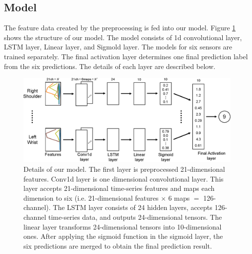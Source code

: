 \documentclass[graybox]{svmult}
\begin{document}
\subsection{Model}
\label{subsec:model}
The feature data created by the preprocessing is fed into our model. Figure \ref{fig:model} shows the structure of our model. The model consists of 1d convolutional layer, LSTM layer, Linear layer, and Sigmold layer. The models for six sensors are trained separately. The final activation layer determines one final prediction label from the six predictions. The details of each layer are described below.

\begin{figure}[h]
    \centering
    \includegraphics[width=1\linewidth]{figures/model.eps}
    \caption{Details of our model. The first layer is preprocessed 21-dimensional features. Conv1d layer is one dimensional convolutional layer. This layer accepts 21-dimensional time-series features and maps each dimension to six (i.e. 21-dimensional features $\times$ 6 maps $=$ 126-channel). The LSTM layer consists of 24 hidden layers, accepts 126-channel time-series data, and outputs 24-dimensional tensors. The linear layer transforms 24-dimensional tensors into 10-dimensional ones. After applying the sigmoid function in the sigmoid layer, the six predictions are merged to obtain the final prediction result.}
    \label{fig:model}
\end{figure}
\end{document}
